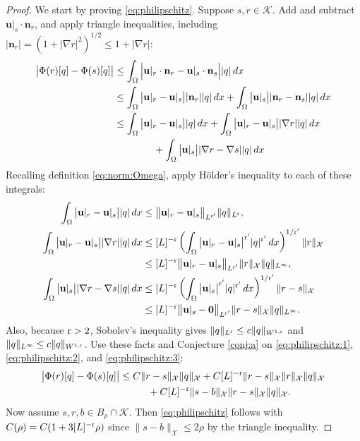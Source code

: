\documentclass[hidelinks,onefignum,onetabnum,final]{siamart220329}  %
\newcommand{\grad}{\nabla}
\newcommand{\bn}{\mathbf{n}}
\newcommand{\bu}{\mathbf{u}}
\newcommand{\bzero}{\bm{0}}
\newcommand{\cK}{\mathcal{K}}
\newcommand{\cX}{\mathcal{X}}
\newcommand{\rr}{{\text{\textnormal{r}}}}
\begin{document}
\begin{proof}
We start by proving \eqref{eq:philipschitz}.  Suppose $s,r\in\cK$.  Add and subtract $\bu|_s \cdot \bn_r$, and apply triangle inequalities, including $|\bn_r|=\left(1+|\grad r|^2\right)^{1/2} \le 1 + |\grad r|$:
\begin{align}
\big|\Phi(r)[q] - \Phi(s)[q]\big| &\le \int_\Omega \Big|\bu|_r\cdot \bn_r - \bu|_s \cdot \bn_s\Big| |q|\,dx \\
    &\le \int_\Omega \big|\bu|_r - \bu|_s\big| |\bn_r| |q|\,dx + \int_\Omega \big|\bu|_s\big| |\bn_r-\bn_s| |q|\,dx \notag \\
    &\le \int_\Omega \big|\bu|_r - \bu|_s\big| |q|\,dx + \int_\Omega \big|\bu|_r - \bu|_s\big| |\grad r| |q|\,dx \notag \\
    &\qquad\qquad + \int_\Omega \big|\bu|_s\big| |\grad r-\grad s| |q|\,dx \notag
\end{align}
Recalling definition \eqref{eq:norm:Omega}, apply H\"older's inequality to each of these integrals:
\begin{align}
\int_\Omega \big|\bu|_r - \bu|_s\big| |q|\,dx &\le \big\|\bu|_r - \bu|_s\big\|_{L^{\rr'}} \|q\|_{L^{\rr}}, \label{eq:philipschitz:1} \\
\int_\Omega \big|\bu|_r - \bu|_s\big| |\grad r| |q|\,dx &\le [L]^{-\rr} \left(\int_\Omega \big|\bu|_r - \bu|_s\big|^{\rr'} |q|^{\rr'}\, dx\right)^{1/\rr'} \|r\|_{\cX} \label{eq:philipschitz:2} \\
    &\le [L]^{-\rr} \big\|\bu|_r - \bu|_s\big\|_{L^{\rr'}} \|r\|_{\cX} \|q\|_{L^\infty}, \notag \\
\int_\Omega \big|\bu|_s\big| |\grad r-\grad s| |q|\,dx &\le [L]^{-\rr} \left(\int_\Omega \big|\bu|_s\big|^{\rr'} |q|^{\rr'}\, dx\right)^{1/\rr'} \|r-s\|_{\cX}  \label{eq:philipschitz:3} \\
    &\le [L]^{-\rr} \big\|\bu|_s - \bzero\big\|_{L^{\rr'}} \|r-s\|_{\cX} \|q\|_{L^\infty}. \notag
\end{align}
Also, because $\rr>2$, Sobolev's inequality gives $\|q\|_{L^{\rr}} \le c \|q\|_{W^{1,\rr}}$ and $\|q\|_{L^\infty} \le c \|q\|_{W^{1,\rr}}$.  Use these facts and Conjecture \ref{conj:a} on \eqref{eq:philipschitz:1}, \eqref{eq:philipschitz:2}, and \eqref{eq:philipschitz:3}:
\begin{align}
\big|\Phi(r)[q] - \Phi(s)[q]\big| &\le C \|r-s\|_{\cX} \|q\|_{\cX} + C [L]^{-\rr} \|r-s\|_{\cX} \|r\|_{\cX} \|q\|_{\cX} \\
    &\hspace{10mm} + C [L]^{-\rr} \|s - b\|_{\cX} \|r-s\|_{\cX} \|q\|_{\cX}. \notag
\end{align}
Now assume $s,r,b\in B_\rho\cap \cK$.  Then \eqref{eq:philipschitz} follows with $C(\rho) = C (1 + 3 [L]^{-\rr} \rho)$ since $\|s - b\|_{\cX}\le 2\rho$ by the triangle inequality.
\end{proof}
\end{document}
